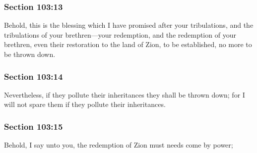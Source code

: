 	\subsubsection{Section 103:13} %
		\label{DC103-13}

		Behold, this is the blessing which I have promised after your tribulations, and the tribulations of your brethren---your redemption, and the redemption of your brethren, even their restoration to the land of Zion, to be established, no more to be thrown down.


	\subsubsection{Section 103:14} %
		\label{DC103-14}

		Nevertheless, if they pollute their inheritances they shall be thrown down; for I will not spare them if they pollute their inheritances.


	\subsubsection{Section 103:15} %
		\label{DC103-15}

		Behold, I say unto you, the redemption of Zion must needs come by power;


